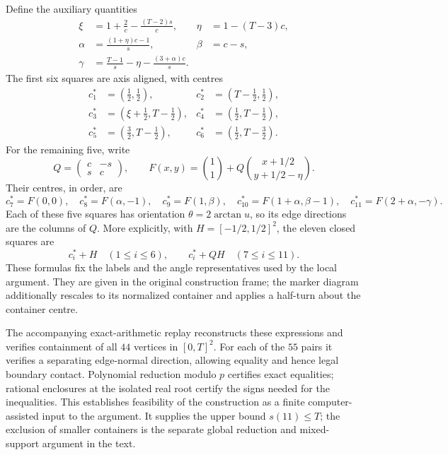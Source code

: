 \documentclass[11pt]{article}
\begin{document}
Define the auxiliary quantities
\[
\begin{aligned}
 \xi&=1+\frac2c-\frac{(T-2)s}{c},
 &\eta&=1-(T-3)c,\\
 \alpha&=\frac{(1+\eta)c-1}{s},
 &\beta&=c-s,\\
 \gamma&=\frac{T-1}{s}-\eta-\frac{(3+\alpha)c}{s}.
\end{aligned}
\]
The first six squares are axis aligned, with centres
\[
\begin{aligned}
 c_1^*&=(\tfrac12,\tfrac12),
 &c_2^*&=(T-\tfrac12,\tfrac12),\\
 c_3^*&=(\xi+\tfrac12,T-\tfrac12),
 &c_4^*&=(\tfrac12,T-\tfrac12),\\
 c_5^*&=(\tfrac32,T-\tfrac12),
 &c_6^*&=(\tfrac12,T-\tfrac32).
\end{aligned}
\]
For the remaining five, write
\[
 Q=\begin{pmatrix}c&-s\\s&c\end{pmatrix},\qquad
 F(x,y)=\binom{1}{1}+Q\binom{x+1/2}{y+1/2-\eta}.
\]
Their centres, in order, are
\[
 c_7^*=F(0,0),\quad
 c_8^*=F(\alpha,-1),\quad
 c_9^*=F(1,\beta),\quad
 c_{10}^*=F(1+\alpha,\beta-1),\quad
 c_{11}^*=F(2+\alpha,-\gamma).
\]
Each of these five squares has orientation $\theta=2\arctan u$, so its
edge directions are the columns of $Q$.  More explicitly, with
$H=[-1/2,1/2]^2$, the eleven closed squares are
\[
 c_i^*+H\quad(1\le i\le6),\qquad
 c_i^*+QH\quad(7\le i\le11).
\]
These formulas fix the labels and the angle representatives used by the
local argument.  They are given in the original construction frame;
the marker diagram additionally rescales to its normalized container and
applies a half-turn about the container centre.

The accompanying exact-arithmetic replay reconstructs these expressions
and verifies containment of all $44$ vertices in $[0,T]^2$.  For each of
the $55$ pairs it verifies a separating edge-normal direction, allowing
equality and hence legal boundary contact.  Polynomial reduction modulo
$p$ certifies exact equalities; rational enclosures at the isolated real
root certify the signs needed for the inequalities.  This establishes
feasibility of the construction as a finite computer-assisted input to
the argument.  It supplies the upper bound $s(11)\le T$; the exclusion of
smaller containers is the separate global reduction and mixed-support argument in the text.
\end{document}
